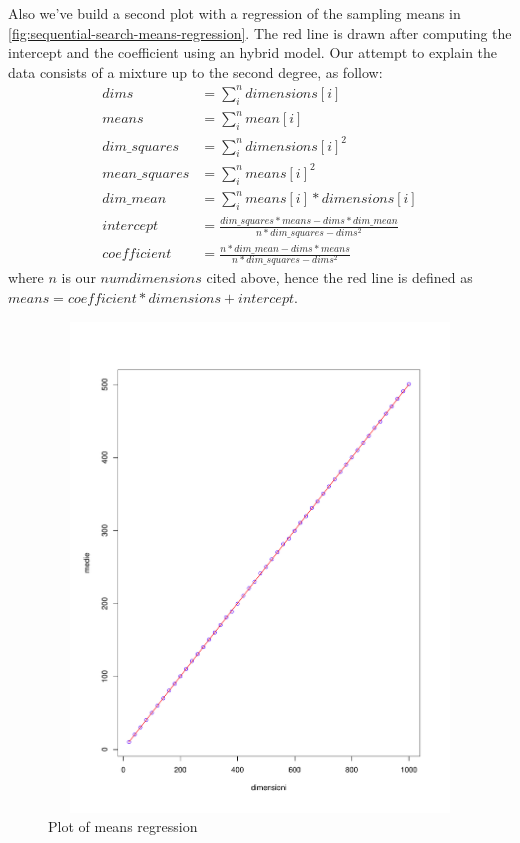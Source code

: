 \documentclass[twoside,openright,titlepage,fleqn,
	headinclude,11pt,a4paper,BCOR5mm,footinclude
	]{scrbook}
\begin{document}
Also we've build a second plot with a regression of the sampling means in
\autoref{fig:sequential-search-means-regression}. The red line is
drawn after computing the intercept and the coefficient using an
hybrid model. Our attempt to explain the data consists of a mixture up
to the second degree, as follow:
\begin{displaymath}
  \begin{split}
    dims &= \sum_{i}^{n}{dimensions[i]}\\
    means &= \sum_{i}^{n}{mean[i]}\\
    dim\_squares &= \sum_{i}^{n}{dimensions[i]^2}\\
    mean\_squares &= \sum_{i}^{n}{means[i]^2}\\
    dim\_mean &= \sum_{i}^{n}{means[i] * dimensions[i]}\\
    intercept &= \frac{dim\_squares * means - dims *
      dim\_mean}{n*dim\_squares - dims^2}\\
    coefficient &= \frac{n * dim\_mean - dims * means} {n*dim\_squares-dims^2}
  \end{split}
\end{displaymath}
where $n$ is our $numdimensions$ cited above, hence the red line is
defined as $means = coefficient*dimensions + intercept$.
\begin{figure}[htb]
\centering
\includegraphics[height=13cm,width=13cm]{pictures/sequential-search-mean-regression-of-sequential-search.pdf}
\caption{Plot of means regression}
\label{fig:sequential-search-means-regression}
\end{figure}
\end{document}
